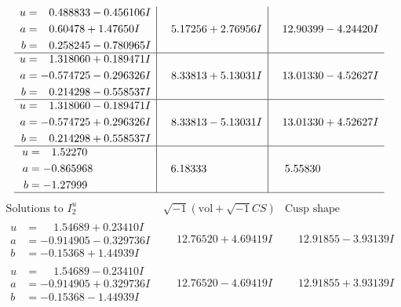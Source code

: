 \documentclass[1p]{elsarticle_modified}
\theoremstyle{definition}
\newcommand{\I}{\sqrt{-1}}
\begin{document}
$$\begin{array}{c|c|c}
\begin{aligned}
u &= \phantom{-}0.488833 - 0.456106 I \\
a &= \phantom{-}0.60478 + 1.47650 I \\
b &= \phantom{-}0.258245 - 0.780965 I\end{aligned}
 & \phantom{-}5.17256 + 2.76956 I & \phantom{-}12.90399 - 4.24420 I \\ \hline\begin{aligned}
u &= \phantom{-}1.318060 + 0.189471 I \\
a &= -0.574725 - 0.296326 I \\
b &= \phantom{-}0.214298 - 0.558537 I\end{aligned}
 & \phantom{-}8.33813 + 5.13031 I & \phantom{-}13.01330 - 4.52627 I \\ \hline\begin{aligned}
u &= \phantom{-}1.318060 - 0.189471 I \\
a &= -0.574725 + 0.296326 I \\
b &= \phantom{-}0.214298 + 0.558537 I\end{aligned}
 & \phantom{-}8.33813 - 5.13031 I & \phantom{-}13.01330 + 4.52627 I \\ \hline\begin{aligned}
u &= \phantom{-}1.52270\phantom{ +0.000000I} \\
a &= -0.865968\phantom{ +0.000000I} \\
b &= -1.27999\phantom{ +0.000000I}\end{aligned}
 & \phantom{-}6.18333\phantom{ +0.000000I} & \phantom{-}5.55830\phantom{ +0.000000I}\\
 \hline 
 \end{array}$$\newpage$$\begin{array}{c|c|c}  
\text{Solutions to }I^u_{2}& \I (\text{vol} + \sqrt{-1}CS) & \text{Cusp shape}\\
 \hline 
\begin{aligned}
u &= \phantom{-}1.54689 + 0.23410 I \\
a &= -0.914905 - 0.329736 I \\
b &= -0.15368 + 1.44939 I\end{aligned}
 & \phantom{-}12.76520 + 4.69419 I & \phantom{-}12.91855 - 3.93139 I \\ \hline\begin{aligned}
u &= \phantom{-}1.54689 - 0.23410 I \\
a &= -0.914905 + 0.329736 I \\
b &= -0.15368 - 1.44939 I\end{aligned}
 & \phantom{-}12.76520 - 4.69419 I & \phantom{-}12.91855 + 3.93139 I \\ \hline\begin{aligned}

\end{aligned}
\end{array}$$
\end{document}
